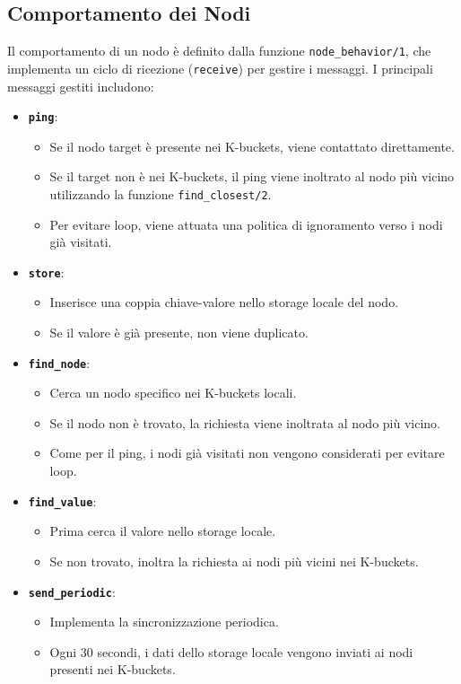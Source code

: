 \documentclass{article}
\begin{document}
\subsection{Comportamento dei Nodi}
Il comportamento di un nodo è definito dalla funzione \texttt{node\_behavior/1}, che implementa un ciclo di ricezione (\texttt{receive}) per gestire i messaggi. I principali messaggi gestiti includono:
\begin{itemize}
    \item \textbf{\texttt{ping}}:
    \begin{itemize}
        \item Se il nodo target è presente nei K-buckets, viene contattato direttamente.
        \item Se il target non è nei K-buckets, il ping viene inoltrato al nodo più vicino utilizzando la funzione \texttt{find\_closest/2}.
        \item Per evitare loop, viene attuata una politica di ignoramento verso i nodi già visitati.
    \end{itemize}
    \item \textbf{\texttt{store}}:
    \begin{itemize}
        \item Inserisce una coppia chiave-valore nello storage locale del nodo.
        \item Se il valore è già presente, non viene duplicato.
    \end{itemize}
    \item \textbf{\texttt{find\_node}}:
    \begin{itemize}
        \item Cerca un nodo specifico nei K-buckets locali.
        \item Se il nodo non è trovato, la richiesta viene inoltrata al nodo più vicino.
        \item Come per il ping, i nodi già visitati non vengono considerati per evitare loop.
    \end{itemize}
    \item \textbf{\texttt{find\_value}}:
    \begin{itemize}
        \item Prima cerca il valore nello storage locale.
        \item Se non trovato, inoltra la richiesta ai nodi più vicini nei K-buckets.
    \end{itemize}
    \item \textbf{\texttt{send\_periodic}}:
    \begin{itemize}
        \item Implementa la sincronizzazione periodica.
        \item Ogni 30 secondi, i dati dello storage locale vengono inviati ai nodi presenti nei K-buckets.
    \end{itemize}
\end{itemize}
\end{document}
